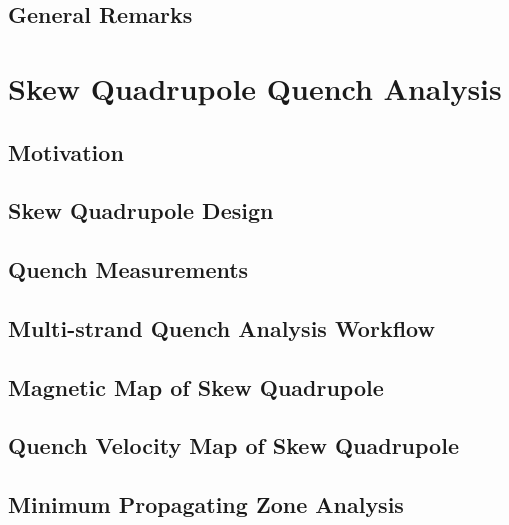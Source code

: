 \documentclass[11pt,a4paper]{report}
\begin{document}
\section{General Remarks}


\clearpage
\chapter{Skew Quadrupole Quench Analysis}
\label{chapter:skew_quadrupole_quench_detection_analysis}

\section{Motivation}


\section{Skew Quadrupole Design}


\section{Quench Measurements}


\section{Multi-strand Quench Analysis Workflow}


\section{Magnetic Map of Skew Quadrupole}


\section{Quench Velocity Map of Skew Quadrupole}


\section{Minimum Propagating Zone Analysis}

\end{document}
